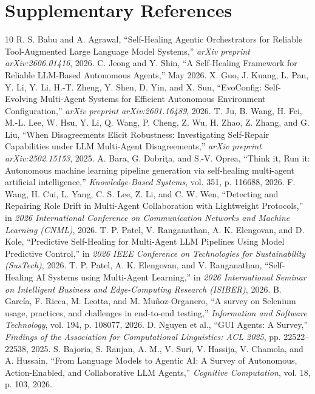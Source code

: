 \documentclass[conference]{IEEEtran}
\begin{document}
\section{Supplementary References}
\label{sec:references}
\begin{thebibliography}{10}
 R. S. Babu and A. Agrawal, ``Self-Healing Agentic Orchestrators for Reliable Tool-Augmented Large Language Model Systems,'' \textit{arXiv preprint arXiv:2606.01416}, 2026.
 C. Jeong and Y. Shin, ``A Self-Healing Framework for Reliable LLM-Based Autonomous Agents,'' May 2026.
 X. Guo, J. Kuang, L. Pan, Y. Li, Y. Li, H.-T. Zheng, Y. Shen, D. Yin, and X. Sun, ``EvoConfig: Self-Evolving Multi-Agent Systems for Efficient Autonomous Environment Configuration,'' \textit{arXiv preprint arXiv:2601.16489}, 2026.
 T. Ju, B. Wang, H. Fei, M.-L. Lee, W. Hsu, Y. Li, Q. Wang, P. Cheng, Z. Wu, H. Zhao, Z. Zhang, and G. Liu, ``When Disagreements Elicit Robustness: Investigating Self-Repair Capabilities under LLM Multi-Agent Disagreements,'' \textit{arXiv preprint arXiv:2502.15153}, 2025.
 A. Bara, G. Dobri\c{t}a, and S.-V. Oprea, ``Think it, Run it: Autonomous machine learning pipeline generation via self-healing multi-agent artificial intelligence,'' \textit{Knowledge-Based Systems}, vol. 351, p. 116688, 2026.
 F. Wang, H. Cui, L. Yang, C. S. Lee, Z. Li, and C. W. Wen, ``Detecting and Repairing Role Drift in Multi-Agent Collaboration with Lightweight Protocols,'' in \textit{2026 International Conference on Communication Networks and Machine Learning (CNML)}, 2026.
 T. P. Patel, V. Ranganathan, A. K. Elengovan, and D. Kole, ``Predictive Self-Healing for Multi-Agent LLM Pipelines Using Model Predictive Control,'' in \textit{2026 IEEE Conference on Technologies for Sustainability (SusTech)}, 2026.
 T. P. Patel, A. K. Elengovan, and V. Ranganathan, ``Self-Healing AI Systems using Multi-Agent Learning,'' in \textit{2026 International Seminar on Intelligent Business and Edge-Computing Research (ISIBER)}, 2026.
 B. Garc\'ia, F. Ricca, M. Leotta, and M. Mu\~noz-Organero, ``A survey on Selenium usage, practices, and challenges in end-to-end testing,'' \textit{Information and Software Technology}, vol. 194, p. 108077, 2026.
 D. Nguyen et al., ``GUI Agents: A Survey,'' \textit{Findings of the Association for Computational Linguistics: ACL 2025}, pp. 22522--22538, 2025.
 S. Bajoria, S. Ranjan, A. M., V. Suri, V. Hassija, V. Chamola, and A. Hussain, ``From Language Models to Agentic AI: A Survey of Autonomous, Action-Enabled, and Collaborative LLM Agents,'' \textit{Cognitive Computation}, vol. 18, p. 103, 2026.
\end{thebibliography}
\end{document}

